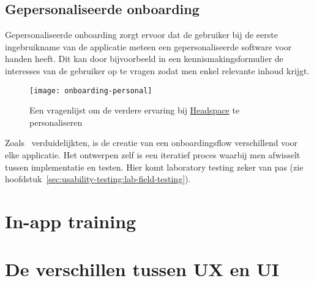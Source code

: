 \subsection{Gepersonaliseerde onboarding}
\label{sec:onboarding:gepersonaliseerd}

Gepersonaliseerde onboarding zorgt ervoor dat de gebruiker bij de eerste ingebruikname van de applicatie meteen een gepersonaliseerde software voor handen heeft. Dit kan door bijvoorbeeld in een kennismakingsformulier de interesses van de gebruiker op te vragen zodat men enkel relevante inhoud krijgt.

\begin{figure}[h!]
    \centering
    \texttt{[image: onboarding-personal]}
    \caption[Voorbeeld gepersonaliseerde onboarding]{Een vragenlijst om de verdere ervaring bij \href{https://www.headspace.com/}{Headspace} te personaliseren}
    \label{fig:onboarding:gepersonaliseerd}
\end{figure}

Zoals~\textcite{Strahm2018} verduidelijkten, is de creatie van een onboardingsflow verschillend voor elke applicatie. Het ontwerpen zelf is een iteratief proces waarbij men afwisselt tussen implementatie en testen. Hier komt laboratory testing zeker van pas (zie hoofdstuk~\ref{sec:usability-testing:lab-field-testing}).

\section{In-app training}
\label{sec:in-app-training}


\section{De verschillen tussen UX en UI}
\label{sec:ux-vs-ui}


